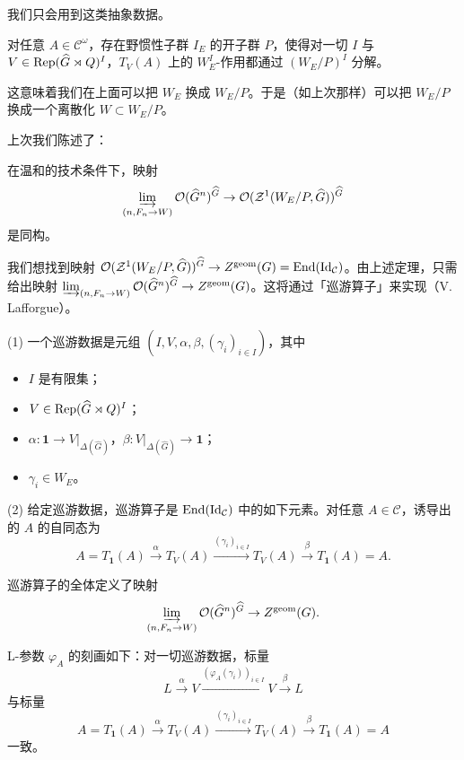 我们只会用到这类抽象数据。

\begin{proposition}
对任意 $A\in\mathcal C^\omega$，存在野惯性子群 $I_E$ 的开子群 $P$，使得对一切 $I$ 与 $V\in\operatorname{Rep}(\widehat G\rtimes Q)^I$，$T_V(A)$ 上的 $W_E^I$-作用都通过 $(W_E/P)^I$ 分解。
\end{proposition}

这意味着我们在上面可以把 $W_E$ 换成 $W_E/P$。于是（如上次那样）可以把 $W_E/P$ 换成一个离散化 $W\subset W_E/P$。

上次我们陈述了：


\begin{theorem}
在温和的技术条件下，映射
\[
\varinjlim_{(n,F_n\to W)}\mathcal O(\widehat G^n)^{\widehat G}\to\mathcal O(\mathcal{Z}^1(W_E/P,\widehat G))^{\widehat G}
\]
是同构。
\end{theorem}

我们想找到映射 $\mathcal O(\mathcal{Z}^1(W_E/P,\widehat G))^{\widehat G}\to Z^{\mathrm{geom}}(G)=\operatorname{End}(\operatorname{Id}_{\mathcal C})$。由上述定理，只需给出映射 $\varinjlim_{(n,F_n\to W)}\mathcal O(\widehat G^n)^{\widehat G}\to Z^{\mathrm{geom}}(G)$。这将通过「巡游算子」来实现（V. Lafforgue）。

\begin{definition}
(1) 一个巡游数据是元组 $(I,V,\alpha,\beta,(\gamma_i)_{i\in I})$，其中
\begin{itemize}
\item $I$ 是有限集；
\item $V\in\operatorname{Rep}(\widehat G\rtimes Q)^I$；
\item $\alpha\colon\mathbf 1\to V|_{\Delta(\widehat G)}$，$\beta\colon V|_{\Delta(\widehat G)}\to\mathbf 1$；
\item $\gamma_i\in W_E$。
\end{itemize}
\hspace*{2em}(2) 给定巡游数据，巡游算子是 $\operatorname{End}(\operatorname{Id}_{\mathcal C})$ 中的如下元素。对任意 $A\in\mathcal C$，诱导出的 $A$ 的自同态为
\[
A=T_{\mathbf 1}(A)\xrightarrow{\alpha}T_V(A)\xrightarrow{(\gamma_i)_{i\in I}}T_V(A)\xrightarrow{\beta}T_{\mathbf 1}(A)=A.
\]
\end{definition}

\begin{proposition}
巡游算子的全体定义了映射
\[
\varinjlim_{(n,F_n\to W)}\mathcal O(\widehat G^n)^{\widehat G}\to Z^{\mathrm{geom}}(G).
\]
\end{proposition}

\begin{corollary}
L-参数 $\varphi_A$ 的刻画如下：对一切巡游数据，标量
\[
L\xrightarrow{\alpha}V\xrightarrow{(\varphi_A(\gamma_i))_{i\in I}}V\xrightarrow{\beta}L
\]
与标量
\[
A=T_{\mathbf 1}(A)\xrightarrow{\alpha}T_V(A)\xrightarrow{(\gamma_i)_{i\in I}}T_V(A)\xrightarrow{\beta}T_{\mathbf 1}(A)=A
\]
一致。
\end{corollary}

